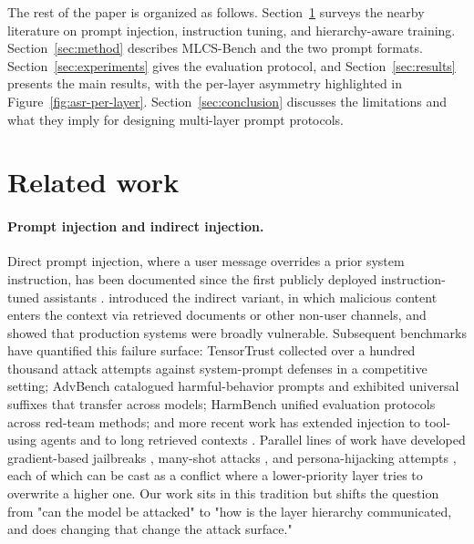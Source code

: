 \documentclass[11pt,twocolumn]{article}
\begin{document}
The rest of the paper is organized as follows. Section~\ref{sec:related} surveys the nearby literature on prompt injection, instruction tuning, and hierarchy-aware training. Section~\ref{sec:method} describes MLCS-Bench and the two prompt formats. Section~\ref{sec:experiments} gives the evaluation protocol, and Section~\ref{sec:results} presents the main results, with the per-layer asymmetry highlighted in Figure~\ref{fig:asr-per-layer}. Section~\ref{sec:conclusion} discusses the limitations and what they imply for designing multi-layer prompt protocols.

\section{Related work}
\label{sec:related}

\paragraph{Prompt injection and indirect injection.}
Direct prompt injection, where a user message overrides a prior system instruction, has been documented since the first publicly deployed instruction-tuned assistants \cite{perez2022ignore, branch2022evaluating, kang2023exploiting, schulhoff2024ignore}. \citet{greshake2023indirect} introduced the indirect variant, in which malicious content enters the context via retrieved documents or other non-user channels, and showed that production systems were broadly vulnerable. Subsequent benchmarks have quantified this failure surface: TensorTrust \cite{toyer2023tensortrust} collected over a hundred thousand attack attempts against system-prompt defenses in a competitive setting; AdvBench \cite{zou2023universal} catalogued harmful-behavior prompts and exhibited universal suffixes that transfer across models; HarmBench \cite{mazeika2024harmbench} unified evaluation protocols across red-team methods; and more recent work has extended injection to tool-using agents \cite{debenedetti2024agentdojo, zhan2024injecagent} and to long retrieved contexts \cite{bagdasaryan2024lms}. Parallel lines of work have developed gradient-based jailbreaks \cite{wei2023jailbroken, andriushchenko2024jailbreaking, xie2024gradient}, many-shot attacks \cite{anil2024manyshot}, and persona-hijacking attempts \cite{shen2024anything, evtimov2024attack}, each of which can be cast as a conflict where a lower-priority layer tries to overwrite a higher one. Our work sits in this tradition but shifts the question from "can the model be attacked" to "how is the layer hierarchy communicated, and does changing that change the attack surface."
\end{document}
